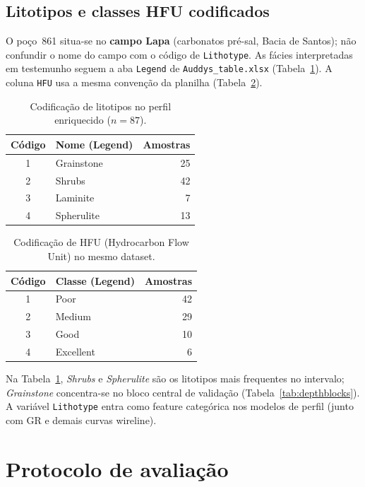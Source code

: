 \documentclass[11pt,a4paper]{article}
\begin{document}
\subsection{Litotipos e classes HFU codificados}

O poço~861 situa-se no \textbf{campo Lapa} (carbonatos pré-sal, Bacia de Santos);
não confundir o nome do campo com o código de \texttt{Lithotype}.
As fácies interpretadas em testemunho seguem a aba \texttt{Legend} de
\texttt{Auddys\_table.xlsx} (Tabela~\ref{tab:lithotypes}).
A coluna \texttt{HFU} usa a mesma convenção da planilha
(Tabela~\ref{tab:hfu_legend}).

\begin{table}[H]
  \centering
  \caption{Codificação de litotipos no perfil enriquecido ($n=87$).}
  \label{tab:lithotypes}
  \begin{tabular}{clr}
    \toprule
    Código & Nome (Legend) & Amostras \\
    \midrule
    1 & Grainstone & 25 \\
    2 & Shrubs & 42 \\
    3 & Laminite & 7 \\
    4 & Spherulite & 13 \\
    \bottomrule
  \end{tabular}
\end{table}

\begin{table}[H]
  \centering
  \caption{Codificação de HFU (Hydrocarbon Flow Unit) no mesmo dataset.}
  \label{tab:hfu_legend}
  \begin{tabular}{clr}
    \toprule
    Código & Classe (Legend) & Amostras \\
    \midrule
    1 & Poor & 42 \\
    2 & Medium & 29 \\
    3 & Good & 10 \\
    4 & Excellent & 6 \\
    \bottomrule
  \end{tabular}
\end{table}

Na Tabela~\ref{tab:lithotypes}, \emph{Shrubs} e \emph{Spherulite} são os
litotipos mais frequentes no intervalo; \emph{Grainstone} concentra-se no
bloco central de validação (Tabela~\ref{tab:depthblocks}).
A variável \texttt{Lithotype} entra como feature categórica nos modelos de
perfil (junto com GR e demais curvas wireline).

\section{Protocolo de avaliação}
\label{sec:protocolo}
\end{document}
